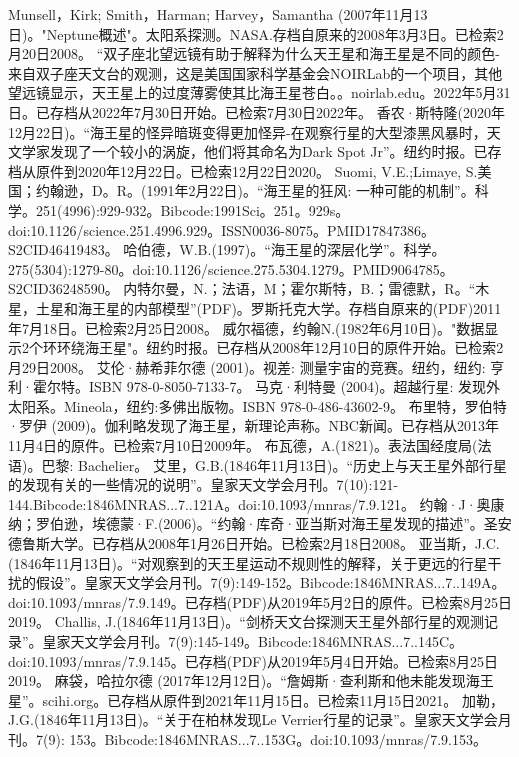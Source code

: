 \begin{enumerate}
 Munsell，Kirk; Smith，Harman; Harvey，Samantha (2007年11月13日)。"Neptune概述"。太阳系探测。NASA.存档自原来的2008年3月3日。已检索2月20日2008。
 “双子座北望远镜有助于解释为什么天王星和海王星是不同的颜色-来自双子座天文台的观测，这是美国国家科学基金会NOIRLab的一个项目，其他望远镜显示，天王星上的过度薄雾使其比海王星苍白。。noirlab.edu。2022年5月31日。已存档从2022年7月30日开始。已检索7月30日2022年。
 香农·斯特隆(2020年12月22日)。“海王星的怪异暗斑变得更加怪异-在观察行星的大型漆黑风暴时，天文学家发现了一个较小的涡旋，他们将其命名为Dark Spot Jr”。纽约时报。已存档从原件到2020年12月22日。已检索12月22日2020。
 Suomi, V.E.;Limaye, S.美国；约翰逊，D。R。(1991年2月22日)。“海王星的狂风: 一种可能的机制”。科学。251(4996):929-932。Bibcode:1991Sci。251。929s。doi:10.1126/science.251.4996.929。ISSN0036-8075。PMID17847386。S2CID46419483。   
 哈伯德，W.B.(1997)。“海王星的深层化学”。科学。275(5304):1279-80。doi:10.1126/science.275.5304.1279。PMID9064785。S2CID36248590。  
 内特尔曼，N.；法语，M；霍尔斯特，B.；雷德默，R。“木星，土星和海王星的内部模型”(PDF)。罗斯托克大学。存档自原来的(PDF)2011年7月18日。已检索2月25日2008。
 威尔福德，约翰N.(1982年6月10日)。"数据显示2个环环绕海王星"。纽约时报。已存档从2008年12月10日的原件开始。已检索2月29日2008。
 艾伦·赫希菲尔德 (2001)。视差: 测量宇宙的竞赛。纽约，纽约: 亨利·霍尔特。ISBN  978-0-8050-7133-7。
 马克·利特曼 (2004)。超越行星: 发现外太阳系。Mineola，纽约:多佛出版物。ISBN 978-0-486-43602-9。
 布里特，罗伯特·罗伊 (2009)。伽利略发现了海王星，新理论声称。NBC新闻。已存档从2013年11月4日的原件。已检索7月10日2009年。
 布瓦德，A.(1821)。表法国经度局(法语)。巴黎: Bachelier。
 艾里，G.B.(1846年11月13日)。“历史上与天王星外部行星的发现有关的一些情况的说明”。皇家天文学会月刊。7(10):121-144.Bibcode:1846MNRAS...7..121A。doi:10.1093/mnras/7.9.121。
 约翰·J·奥康纳；罗伯逊，埃德蒙·F.(2006)。“约翰·库奇·亚当斯对海王星发现的描述”。圣安德鲁斯大学。已存档从2008年1月26日开始。已检索2月18日2008。
 亚当斯，J.C.(1846年11月13日)。“对观察到的天王星运动不规则性的解释，关于更远的行星干扰的假设”。皇家天文学会月刊。7(9):149-152。Bibcode:1846MNRAS...7..149A。doi:10.1093/mnras/7.9.149。已存档(PDF)从2019年5月2日的原件。已检索8月25日2019。
 Challis, J.(1846年11月13日)。“剑桥天文台探测天王星外部行星的观测记录”。皇家天文学会月刊。7(9):145-149。Bibcode:1846MNRAS...7..145C。doi:10.1093/mnras/7.9.145。已存档(PDF)从2019年5月4日开始。已检索8月25日2019。
 麻袋，哈拉尔德 (2017年12月12日)。“詹姆斯·查利斯和他未能发现海王星”。scihi.org。已存档从原件到2021年11月15日。已检索11月15日2021。
 加勒，J.G.(1846年11月13日)。“关于在柏林发现Le Verrier行星的记录”。皇家天文学会月刊。7(9): 153。Bibcode:1846MNRAS...7..153G。doi:10.1093/mnras/7.9.153。

\end{enumerate}
